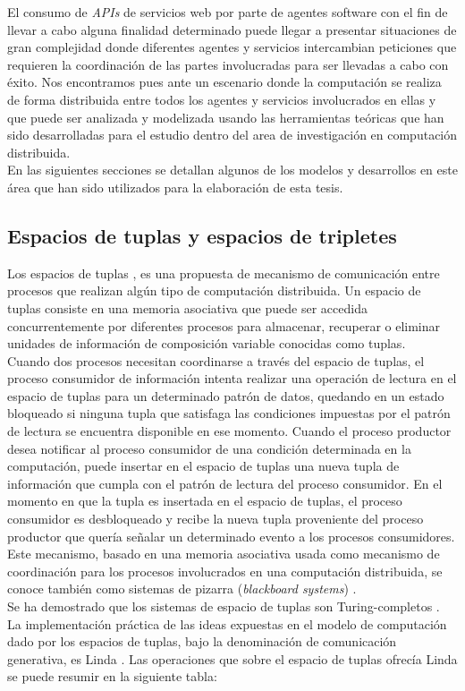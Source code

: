 El consumo de \textit{APIs} de servicios web por parte de agentes software con el fin de llevar a cabo alguna finalidad determinado puede llegar a presentar situaciones de gran complejidad donde diferentes agentes y servicios intercambian peticiones que requieren la coordinaci\'on de las partes involucradas para ser llevadas a cabo con \'exito. Nos encontramos pues ante un escenario donde la computaci\'on se realiza de forma distribuida entre todos los agentes y servicios involucrados en ellas y que puede ser analizada y modelizada usando las herramientas te\'oricas que han sido desarrolladas para el estudio dentro del area de investigaci\'on en computaci\'on distribuida.\\
En las siguientes secciones se detallan algunos de los modelos y desarrollos en este \'area que han sido utilizados para la elaboraci\'on de esta tesis.\\

\subsection{Espacios de tuplas y espacios de tripletes}

Los espacios de tuplas \cite{bussler2005minimal}, es una propuesta de mecanismo de comunicaci\'on entre procesos que realizan alg\'un tipo de computaci\'on distribuida. Un espacio de tuplas consiste en una memoria asociativa que puede ser accedida concurrentemente por diferentes procesos para almacenar, recuperar o eliminar unidades de informaci\'on de composici\'on variable conocidas como tuplas.\\
Cuando dos procesos necesitan coordinarse a trav\'es del espacio de tuplas, el proceso consumidor de informaci\'on intenta realizar una operaci\'on de lectura en el espacio de tuplas para un determinado patr\'on de datos, quedando en un estado bloqueado si ninguna tupla que satisfaga las condiciones impuestas por el patr\'on de lectura se encuentra disponible en ese momento. Cuando el proceso productor desea notificar al proceso consumidor de una condici\'on determinada en la computaci\'on, puede insertar en el espacio de tuplas una nueva tupla de informaci\'on que cumpla con el patr\'on de lectura del proceso consumidor. En el momento en que la tupla es insertada en el espacio de tuplas, el proceso consumidor es desbloqueado y recibe la nueva tupla proveniente del proceso productor que quer\'ia se\~nalar un determinado evento a los procesos consumidores. Este mecanismo, basado en una memoria asociativa usada como mecanismo de coordinaci\'on para los procesos involucrados en una computaci\'on distribuida, se conoce tambi\'en como sistemas de pizarra (\textit{blackboard systems}) \cite{nii1986blackboard}.\\
Se ha demostrado que los sistemas de espacio de tuplas son Turing-completos \cite{busi2000expressiveness}. La implementaci\'on pr\'actica de las ideas expuestas en el modelo de computaci\'on dado por los espacios de tuplas, bajo la denominaci\'on de comunicaci\'on generativa, es Linda \cite{linda}. Las operaciones que sobre el espacio de tuplas ofrec\'ia Linda se puede resumir en la siguiente tabla:\\


